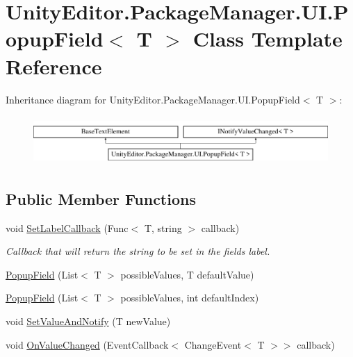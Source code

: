 \hypertarget{class_unity_editor_1_1_package_manager_1_1_u_i_1_1_popup_field}{}\section{Unity\+Editor.\+Package\+Manager.\+U\+I.\+Popup\+Field$<$ T $>$ Class Template Reference}
\label{class_unity_editor_1_1_package_manager_1_1_u_i_1_1_popup_field}
Inheritance diagram for Unity\+Editor.\+Package\+Manager.\+U\+I.\+Popup\+Field$<$ T $>$\+:\begin{figure}[H]
\begin{center}
\leavevmode
\includegraphics[height=1.872910cm]{class_unity_editor_1_1_package_manager_1_1_u_i_1_1_popup_field}
\end{center}
\end{figure}
\subsection*{Public Member Functions}
\begin{DoxyCompactItemize}
\item 
void \mbox{\hyperlink{class_unity_editor_1_1_package_manager_1_1_u_i_1_1_popup_field_a9abe30176e465f59b1fa19c914fd9e64}{Set\+Label\+Callback}} (Func$<$ T, string $>$ callback)
\begin{DoxyCompactList}\small\item\em Callback that will return the string to be set in the field\textquotesingle{}s label. \end{DoxyCompactList}\item 
\mbox{\hyperlink{class_unity_editor_1_1_package_manager_1_1_u_i_1_1_popup_field_a64c78e65aa749d7de30ffde3428eef39}{Popup\+Field}} (List$<$ T $>$ possible\+Values, T default\+Value)
\item 
\mbox{\hyperlink{class_unity_editor_1_1_package_manager_1_1_u_i_1_1_popup_field_a758cc96ab9fe6b8cb8548fd131487d97}{Popup\+Field}} (List$<$ T $>$ possible\+Values, int default\+Index)
\item 
void \mbox{\hyperlink{class_unity_editor_1_1_package_manager_1_1_u_i_1_1_popup_field_a1eda78f748bcbb8dca9280f4a0ee9ff9}{Set\+Value\+And\+Notify}} (T new\+Value)
\item 
void \mbox{\hyperlink{class_unity_editor_1_1_package_manager_1_1_u_i_1_1_popup_field_a805375871c4f16bb18d81e28923fe7ca}{On\+Value\+Changed}} (Event\+Callback$<$ Change\+Event$<$ T $>$$>$ callback)
\end{DoxyCompactItemize}
